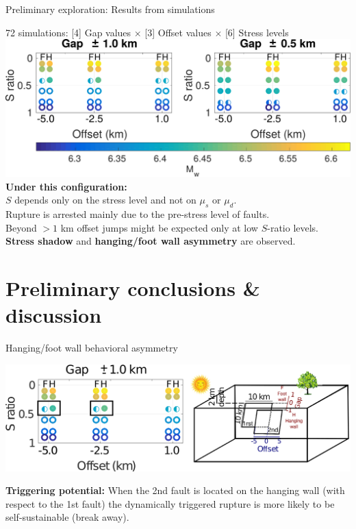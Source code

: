 \documentclass{beamer}
\begin{document}
\begin{frame}
 {Preliminary exploration: Results from simulations}
 
{\small 72 simulations: [4] Gap values $\times$ [3] Offset values $\times$ [6] Stress levels}
 \vskip 0.2cm
 \includegraphics[width=1\linewidth]{images/results_table}
\vskip -0.5cm{\bf Under this configuration:} \pause \\
\vskip 0.1cm
\small $S$ depends only on the stress level and not on $\mu_s$ or $\mu_d$. \pause \\ 
\vskip 0.1cm
\small Rupture is arrested mainly due to the pre-stress level of faults. \pause \\
\vskip 0.1cm
\small Beyond $>1$ km offset jumps might be expected only at low $S$-ratio levels. \pause \\
\vskip 0.1cm
\small {\bf Stress shadow} and {\bf hanging/foot wall asymmetry} are observed. 

\end{frame}


\section{Preliminary conclusions \& discussion}

\begin{frame}
 {Hanging/foot wall behavioral asymmetry}
 
 \begin{center}
 \includegraphics[width=1\linewidth]{images/schematic_view_noparam.png} 
 \end{center}

{\bf Triggering potential:}
\vskip 0.2cm
When the 2nd fault is located on the hanging wall (with respect to the 1st fault) the dynamically triggered rupture is more likely to be self-sustainable (break away).

\end{frame}
\end{document}
